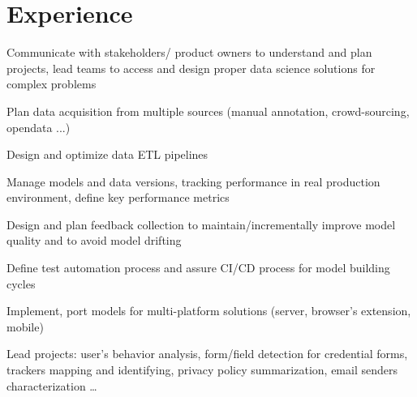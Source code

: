 \documentclass[letterpaper]{deedy-resume} %
\begin{document}
\hfill
%
%
\begin{minipage}[t]{0.66\textwidth} %


\section{Experience}


\vspace{\topsep} %
\begin{tightitemize}
\item Communicate with stakeholders/ product owners to understand and plan projects, lead teams to access and design proper data science solutions for complex problems
\item Plan data acquisition from multiple sources (manual annotation, crowd-sourcing, opendata ...)
\item Design and optimize data ETL pipelines
\item Manage models and data versions, tracking performance in real production environment, define key performance metrics
\item Design and plan feedback collection to maintain/incrementally improve model quality and to avoid model drifting
\item Define test automation process and assure CI/CD process for model building cycles
\item Implement, port models for multi-platform solutions (server, browser's extension, mobile)
\item Lead projects: user's behavior analysis, form/field detection for credential forms, trackers mapping and identifying, privacy policy summarization, email senders characterization \dots
\end{tightitemize}
\sectionspace %



\end{minipage}
\end{document}
